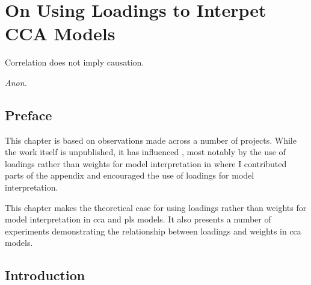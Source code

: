 \graphicspath{{chapters/loadings/}}
\chapter{On Using Loadings to Interpet CCA Models}\label{chap:loadings}
\epigraph{Correlation does not imply causation.}{\textit{Anon.}}
\minitoc
\section{Preface}

This chapter is based on observations made across a number of projects.
While the work itself is unpublished, it has influenced , most notably by the use of loadings rather than weights for model interpretation in \citet{} where I contributed parts of the appendix and encouraged the use of loadings for model interpretation.

This chapter makes the theoretical case for using loadings rather than weights for model interpretation in \acrshort{cca} and \acrshort{pls} models.
It also presents a number of experiments demonstrating the relationship between loadings and weights in \acrshort{cca} models.

\section{Introduction}

